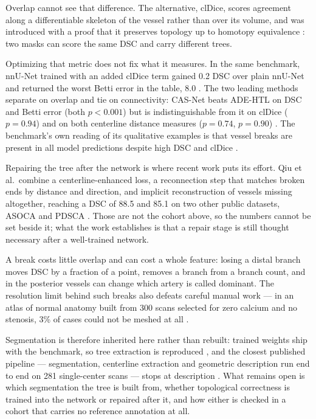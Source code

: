 Overlap cannot see that difference.
The alternative, clDice, scores agreement along a differentiable skeleton of the vessel rather than
over its volume,
and was introduced with a proof that it preserves topology up to homotopy equivalence
\cite{shit2021cldice}: two masks can score the same DSC and carry different trees.

Optimizing that metric does not fix what it measures.
In the same benchmark, nnU-Net trained with an added clDice term gained 0.2 DSC over plain nnU-Net
and returned the worst Betti error in the table, 8.0 \cite{isensee2021nnunet}.
The two leading methods separate on overlap and tie on connectivity: CAS-Net beats ADE-HTL on DSC
and Betti error (both $p<0.001$) but is indistinguishable from it on clDice ($p=0.94$) and on both
centerline distance measures ($p=0.74$, $p=0.90$) \cite{zhang2024adehtl}.
The benchmark's own reading of its qualitative examples is that vessel breaks are present in all
model predictions despite high DSC and clDice \cite{bransby2026imagecasx}.

Repairing the tree after the network is where recent work puts its effort.
Qiu et al.\ combine a centerline-enhanced loss, a reconnection step that matches broken ends by
distance and direction, and implicit reconstruction of vessels missing altogether, reaching a DSC of
88.5 and 85.1 on two other public datasets, ASOCA and PDSCA \cite{qiu2025topology}.
Those are not the cohort above, so the numbers cannot be set beside it; what the work establishes is
that a repair stage is still thought necessary after a well-trained network.

A break costs little overlap and can cost a whole feature: losing a distal branch moves DSC by a
fraction of a point, removes a branch from a branch count, and in the posterior vessels can change
which artery is called dominant.
The resolution limit behind such breaks also defeats careful manual work --- in an atlas of normal
anatomy built from 300 scans selected for zero calcium and no stenosis, 3\% of cases could not be
meshed at all \cite{medranogracia2016atlas}.

Segmentation is therefore inherited here rather than rebuilt: trained weights ship with the
benchmark, so tree extraction is reproduced \cite{bransby2026imagecasx}, and the closest published
pipeline --- segmentation, centerline extraction and geometric description run end to end on 281
single-center scans --- stops at description \cite{nannini2024characterization}.
What remains open is which segmentation the tree is built from, whether topological correctness is
trained into the network or repaired after it, and how either is checked in a cohort that carries no
reference annotation at all.
